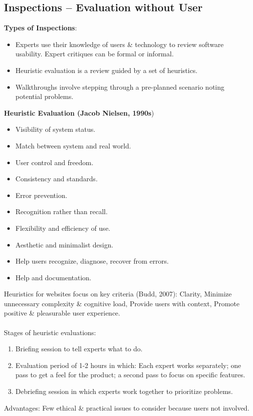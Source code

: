 \subsection{Inspections -- Evaluation without User}
\textbf{Types of Inspections}:
\begin{itemize}
\item Experts use their knowledge of users \& technology to review software usability. Expert critiques can be formal or informal.
\item Heuristic evaluation is a review guided by a set of heuristics.
\item Walkthroughs involve stepping through a pre-planned scenario noting potential problems.
\end{itemize}
\textbf{Heuristic Evaluation (Jacob Nielsen, 1990s})
\begin{itemize}
\item Visibility of system status.
\item Match between system and real world.
\item User control and freedom.
\item Consistency and standards.
\item Error prevention.
\item Recognition rather than recall.
\item Flexibility and efficiency of use.
\item Aesthetic and minimalist design.
\item Help users recognize, diagnose, recover from errors.
\item Help and documentation.
\end{itemize}
Heuristics for websites focus on key criteria (Budd, 2007): Clarity, Minimize unnecessary complexity \& cognitive load, Provide users with context, Promote positive \& pleasurable user
experience.\\\\
Stages of heuristic evaluations:
\begin{enumerate}
\item Briefing session to tell experts what to do.
\item Evaluation period of 1-2 hours in which: Each expert works separately; one pass to get a feel for the product; a second pass to focus on specific features.
\item Debriefing session in which experts work together to prioritize problems.
\end{enumerate}
Advantages: Few ethical \& practical issues to consider because users not involved.\\
